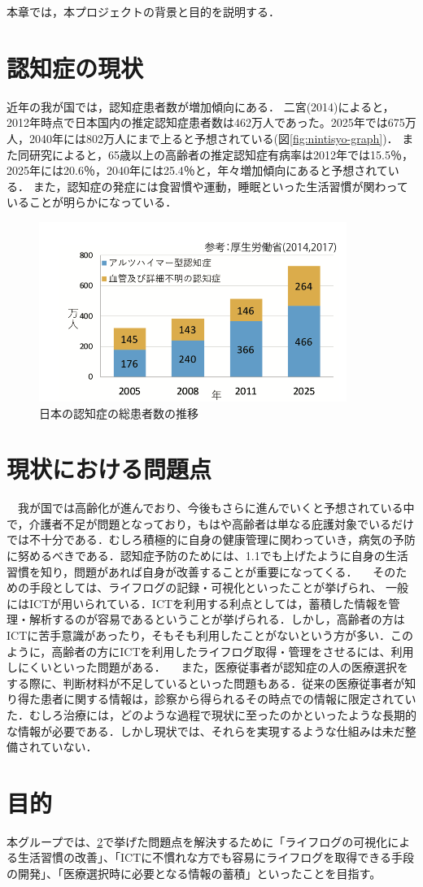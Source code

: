 \documentclass[../report]{subfiles}
\begin{document}
本章では，本プロジェクトの背景と目的を説明する．

\section{認知症の現状} \label{sec:genzyou}
近年の我が国では，認知症患者数が増加傾向にある．
二宮(2014)によると，2012年時点で日本国内の推定認知症患者数は462万人であった\cite{syourai}。2025年では675万人，2040年には802万人にまで上ると予想されている(図\ref{fig:nintisyo-graph})．
また同研究によると，65歳以上の高齢者の推定認知症有病率は2012年では15.5％，2025年には20.6％，2040年には25.4％と，年々増加傾向にあると予想されている\cite{syourai}．
また，認知症の発症には食習慣や運動，睡眠といった生活習慣が関わっていることが明らかになっている\cite{seikatsu}．
\begin{figure}[htbp]
    \begin{center}
        \includegraphics[width=10cm]{imgs/ninchisyo-graph.png}
        \caption{日本の認知症の総患者数の推移}
        \label{fig:ninchisyo-graph}
    \end{center}
\end{figure}

\section{現状における問題点} \label{sec:mondai}
　我が国では高齢化が進んでおり、今後もさらに進んでいくと予想されている中で，介護者不足が問題となっており，もはや高齢者は単なる庇護対象でいるだけでは不十分である\cite{kaigo}．むしろ積極的に自身の健康管理に関わっていき，病気の予防に努めるべきである．認知症予防のためには、1.1でも上げたように自身の生活習慣を知り，問題があれば自身が改善することが重要になってくる．
　そのための手段としては、ライフログの記録・可視化といったことが挙げられ\cite{lifelog}、 一般にはICTが用いられている．ICTを利用する利点としては，蓄積した情報を管理・解析するのが容易であるということが挙げられる．しかし，高齢者の方はICTに苦手意識があったり，そもそも利用したことがないという方が多い．このように，高齢者の方にICTを利用したライフログ取得・管理をさせるには、利用しにくいといった問題がある．
　また，医療従事者が認知症の人の医療選択をする際に、判断材料が不足しているといった問題もある．従来の医療従事者が知り得た患者に関する情報は，診察から得られるその時点での情報に限定されていた．むしろ治療には，どのような過程で現状に至ったのかといったような長期的な情報が必要である．しかし現状では、それらを実現するような仕組みは未だ整備されていない．

\section{目的}
本グループでは、\ref{sec:mondai}で挙げた問題点を解決するために「ライフログの可視化による生活習慣の改善」、「ICTに不慣れな方でも容易にライフログを取得できる手段の開発」、「医療選択時に必要となる情報の蓄積」といったことを目指す。
\end{document}

